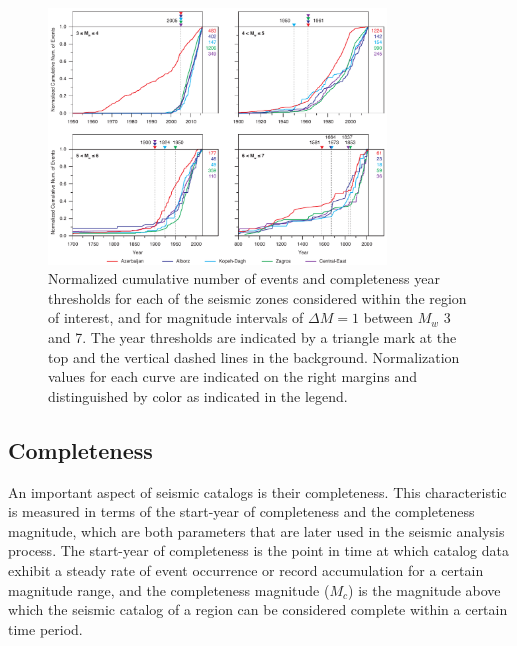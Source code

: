 
\begin{figure}[t]
    \centering
    \includegraphics[width=0.8\textwidth]{figures/pdf/figure-05.pdf}
    \caption{Normalized cumulative number of events and completeness year thresholds for each of the seismic zones considered within the region of interest, and for magnitude intervals of $\Delta M = 1$ between $M_w$ 3 and 7. The year thresholds are indicated by a triangle mark at the top and the vertical dashed lines in the background. Normalization values for each curve are indicated on the right margins and distinguished by color as indicated in the legend.}
    \label{fig:completeness}
\end{figure}

\subsection{Completeness}

An important aspect of seismic catalogs is their completeness. This characteristic is measured in terms of the start-year of completeness and the completeness magnitude, which are both parameters that are later used in the seismic analysis process. The start-year of completeness is the point in time at which catalog data exhibit a steady rate of event occurrence or record accumulation for a certain magnitude range, and the completeness magnitude ($M_c$) is the magnitude above which the seismic catalog of a region can be considered complete within a certain time period. 

